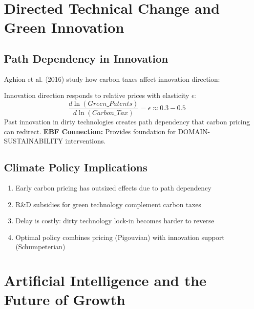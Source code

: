 \section{Directed Technical Change and Green Innovation}

\subsection{Path Dependency in Innovation}

Aghion et al. (2016) study how carbon taxes affect innovation direction:

\begin{axiom}
\label{ax:pa6}
Innovation direction responds to relative prices with elasticity $\epsilon$:
\begin{equation}
\frac{d \ln(Green\_Patents)}{d \ln(Carbon\_Tax)} = \epsilon \approx 0.3-0.5
\end{equation}
Past innovation in dirty technologies creates path dependency that carbon pricing can redirect.
\textbf{EBF Connection:} Provides foundation for DOMAIN-SUSTAINABILITY interventions.
\end{axiom}

\subsection{Climate Policy Implications}

\begin{tcolorbox}[colback=yellow!10!white, colframe=yellow!75!black, title=Policy Implications]
\begin{enumerate}
    \item Early carbon pricing has outsized effects due to path dependency
    \item R\&D subsidies for green technology complement carbon taxes
    \item Delay is costly: dirty technology lock-in becomes harder to reverse
    \item Optimal policy combines pricing (Pigouvian) with innovation support (Schumpeterian)
\end{enumerate}
\end{tcolorbox}

\section{Artificial Intelligence and the Future of Growth}

